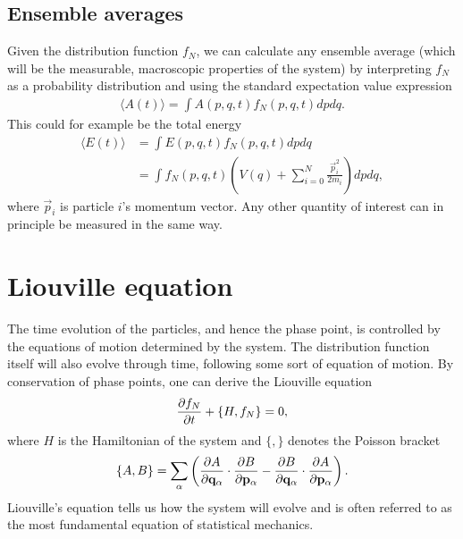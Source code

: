 \subsection{Ensemble averages}
Given the distribution function $f_N$, we can calculate any ensemble average (which will be the measurable, macroscopic properties of the system) by interpreting $f_N$ as a probability distribution and using the standard expectation value expression
\begin{align}
	\langle A(t) \rangle = \int A(p, q, t)f_N(p, q, t)dpdq.
\end{align}
This could for example be the total energy
\begin{align}
	\langle E(t) \rangle &= \int E(p, q, t)f_N(p, q, t)dpdq \\
	&= \int f_N(p, q, t)\left(V(q) + \sum_{i=0}^N \frac{\vec p_i^2}{2m_i} \right)dpdq,
\end{align}
where $\vec p_i$ is particle $i$'s momentum vector. Any other quantity of interest can in principle be measured in the same way. 

\section{Liouville equation}
The time evolution of the particles, and hence the phase point, is controlled by the equations of motion determined by the system. The distribution function itself will also evolve through time, following some sort of equation of motion. By conservation of phase points, one can derive the Liouville equation
\begin{align}
	\frac{\partial f_N}{\partial t} + \{H, f_N\} = 0,
\end{align}
where $H$ is the Hamiltonian of the system and $\{,\}$ denotes the Poisson bracket
\begin{align}
	\{A,B\} = \sum_\alpha\left( \frac{\partial A}{\partial \mathbf q_\alpha}\cdot\frac{\partial B}{\partial \mathbf p_\alpha} - \frac{\partial B}{\partial \mathbf q_\alpha}\cdot\frac{\partial A}{\partial \mathbf p_\alpha}\right).
\end{align}
 Liouville's equation tells us how the system will evolve and is often referred to as the most fundamental equation of statistical mechanics\cite{mcquarrie1973statistical}. 
